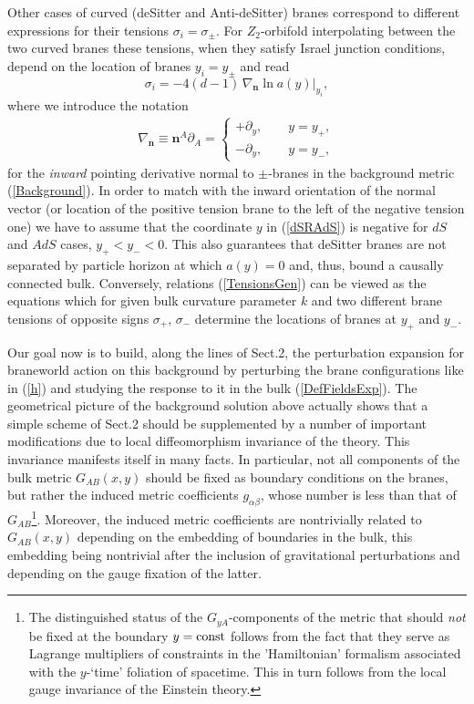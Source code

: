 \documentclass[a4paper,12pt]{article}
\newcommand{\ZA}{{A}}   %
\newcommand{\p}{{+}}
\newcommand{\n}{{-}}
\newcommand{\yp}{{y_{+}}}
\newcommand{\yn}{{y_{-}}}
\newcommand{\ddim}{{d}}
\newcommand{\un}{\mathbf n} %
\newcommand{\ddy}{{\partial_y}}
\newcommand{\Bnabla}{\nabla}  %
\newcommand{\tens}{{\sigma}}
\begin{document}
Other cases of curved (deSitter and Anti-deSitter) branes
correspond to different expressions for their tensions
$\sigma_i=\sigma_\pm$. For $Z_2$-orbifold interpolating between
the two curved branes these tensions, when they satisfy Israel
junction conditions, depend on the location of branes $y_i=y_\pm$
and read
    \begin{equation}
     \tens_i=-4(\ddim-1)\,
     \Bnabla_{\un}\ln{a(y)}\Big|_{y_i},      \label{TensionsGen}
    \end{equation}
where we introduce the notation
    \begin{eqnarray}
     \Bnabla_{\un} \equiv\un^\ZA
     \partial_\ZA=
     \left\{\begin{array}{l}
     +\ddy, \qquad y=\yp,\\
     -\ddy, \qquad y=\yn,
     \end{array}\right.             \label{Def_nabla_n}
    \end{eqnarray}
for the {\em inward} pointing derivative normal to $\pm$-branes in
the background metric (\ref{Background}). In order to match with
the inward orientation of the normal vector (or location of the
positive tension brane to the left of the negative tension one) we
have to assume that the coordinate $y$ in (\ref{dSRAdS}) is
negative for $dS$ and $AdS$ cases, $y_\p < y_\n < 0$. This also
guarantees that deSitter branes are not separated by particle
horizon at which $a(y)=0$ \cite{ParikhSol,BWSolutions} and, thus,
bound a causally connected bulk. Conversely, relations
(\ref{TensionsGen}) can be viewed as the equations which for given
bulk curvature parameter $k$ and two different brane tensions of
opposite signs $\tens_\p,\,\tens_\n$ determine the locations of
branes at $y_\p$ and $y_\n$.

Our goal now is to build, along the lines of Sect.2, the
perturbation expansion for braneworld action on this background by
perturbing the brane configurations like in (\ref{h}) and studying
the response to it in the bulk (\ref{DefFieldsExp}). The
geometrical picture of the background solution above actually
shows that a simple scheme of Sect.2 should be supplemented by a
number of important modifications due to local diffeomorphism
invariance of the theory. This invariance manifests itself in many
facts. In particular, not all components of the bulk metric
$G_{AB}(x,y)$ should be fixed as boundary conditions on the
branes, but rather the induced metric coefficients
$g_{\alpha\beta}$, whose number is less than that of
$G_{AB}$\footnote{The distinguished status of the
$G_{yA}$-components of the metric that should {\em not} be fixed
at the boundary $y={\rm const}$ follows from the fact that they
serve as Lagrange multipliers of constraints in the 'Hamiltonian'
formalism associated with the $y$-`time' foliation of spacetime.
This in turn follows from the local gauge invariance of the
Einstein theory.}. Moreover, the induced metric coefficients are
nontrivially related to $G_{AB}(x,y)$ depending on the embedding
of boundaries in the bulk, this embedding being nontrivial after
the inclusion of gravitational perturbations and depending on the
gauge fixation of the latter.
\end{document}
